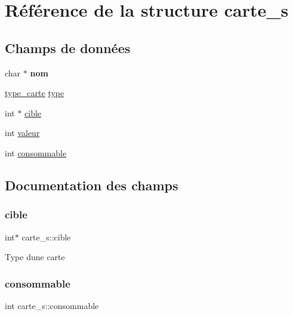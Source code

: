 \hypertarget{structcarte__s}{}\section{Référence de la structure carte\+\_\+s}
\label{structcarte__s}
\subsection*{Champs de données}
\begin{DoxyCompactItemize}
\item 
\mbox{\label{structcarte__s_ab9392e0daefb7741dfd865fe8325c9ec}} 
char $\ast$ {\bfseries nom}
\item 
\hyperlink{constantes_8h_a8fb27eb0b354a4f35787ef57ac90e0eb}{type\+\_\+carte} \hyperlink{structcarte__s_aaf26c6876557066201a63c65c9ef8e5a}{type}
\item 
int $\ast$ \hyperlink{structcarte__s_a0ecc33306c04f8ef73f8f5ff72d85e5e}{cible}
\item 
int \hyperlink{structcarte__s_a432f48dcc3d414a0bdaeb77855060ee1}{valeur}
\item 
int \hyperlink{structcarte__s_ae3d8785ea9e22eb0115da8559cea7a72}{consommable}
\end{DoxyCompactItemize}


\subsection{Documentation des champs}
\mbox{\label{structcarte__s_a0ecc33306c04f8ef73f8f5ff72d85e5e}} 
\subsubsection{\texorpdfstring{cible}{cible}}
{\footnotesize\ttfamily int$\ast$ carte\+\_\+s\+::cible}

Type d\textquotesingle{}une carte \mbox{\label{structcarte__s_ae3d8785ea9e22eb0115da8559cea7a72}} 
\subsubsection{\texorpdfstring{consommable}{consommable}}
{\footnotesize\ttfamily int carte\+\_\+s\+::consommable}

